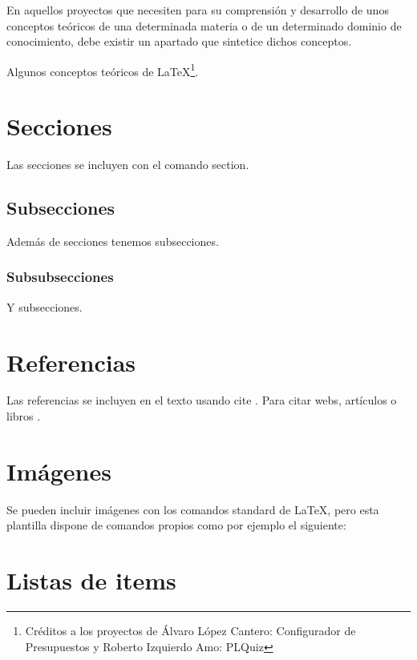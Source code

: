 
En aquellos proyectos que necesiten para su comprensión y desarrollo de unos
conceptos teóricos de una determinada materia o de un determinado dominio de
conocimiento, debe existir un apartado que sintetice dichos conceptos.

Algunos conceptos teóricos de \LaTeX \footnote{Créditos a los proyectos de
	Álvaro López Cantero: Configurador de Presupuestos y Roberto Izquierdo Amo:
	PLQuiz}.

\section{Secciones}

Las secciones se incluyen con el comando section.

\subsection{Subsecciones}

Además de secciones tenemos subsecciones.

\subsubsection{Subsubsecciones}

Y subsecciones. 


\section{Referencias}

Las referencias se incluyen en el texto usando cite \cite{wiki:latex}. Para
citar webs, artículos o libros \cite{koza92}.


\section{Imágenes}

Se pueden incluir imágenes con los comandos standard de \LaTeX, pero esta
plantilla dispone de comandos propios como por ejemplo el siguiente:




\section{Listas de items}


